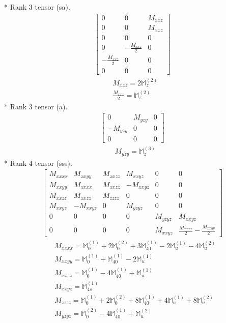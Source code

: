 \documentclass[fleqn,8pt,landscape]{jsarticle}
\begin{document}
* Rank 3 tensor (sa).
\begin{align*}
\begin{bmatrix} 0 & 0 & M_{xxz} \\ 0 & 0 & M_{xxz} \\ 0 & 0 & 0 \\ 0 & - \frac{M_{xxz}}{2} & 0 \\ - \frac{M_{xxz}}{2} & 0 & 0 \\ 0 & 0 & 0 \end{bmatrix}
\end{align*}
\begin{align*}
& M_{xxz} = 2 \mathbb{M}_{z}^{(2)} \\
& \frac{M_{xxz}}{2} = \mathbb{M}_{z}^{(2)}
\end{align*}
* Rank 3 tensor (a).
\begin{align*}
\begin{bmatrix} 0 & M_{yzy} & 0 \\ - M_{yzy} & 0 & 0 \\ 0 & 0 & 0 \end{bmatrix}
\end{align*}
\begin{align*}
& M_{yzy} = \mathbb{M}_{z}^{(3)}
\end{align*}
* Rank 4 tensor (sss).
\begin{align*}
\begin{bmatrix} M_{xxxx} & M_{xxyy} & M_{xxzz} & M_{xxyz} & 0 & 0 \\ M_{xxyy} & M_{xxxx} & M_{xxzz} & - M_{xxyz} & 0 & 0 \\ M_{xxzz} & M_{xxzz} & M_{zzzz} & 0 & 0 & 0 \\ M_{xxyz} & - M_{xxyz} & 0 & M_{yzyz} & 0 & 0 \\ 0 & 0 & 0 & 0 & M_{yzyz} & M_{xxyz} \\ 0 & 0 & 0 & 0 & M_{xxyz} & \frac{M_{xxxx}}{2} - \frac{M_{xxyy}}{2} \end{bmatrix}
\end{align*}
\begin{align*}
& M_{xxxx} = \mathbb{M}_{0}^{(1)} + 2 \mathbb{M}_{0}^{(2)} + 3 \mathbb{M}_{40}^{(1)} - 2 \mathbb{M}_{u}^{(1)} - 4 \mathbb{M}_{u}^{(2)} \\
& M_{xxyy} = \mathbb{M}_{0}^{(1)} + \mathbb{M}_{40}^{(1)} - 2 \mathbb{M}_{u}^{(1)} \\
& M_{xxzz} = \mathbb{M}_{0}^{(1)} - 4 \mathbb{M}_{40}^{(1)} + \mathbb{M}_{u}^{(1)} \\
& M_{xxyz} = \mathbb{M}_{4s}^{(1)} \\
& M_{zzzz} = \mathbb{M}_{0}^{(1)} + 2 \mathbb{M}_{0}^{(2)} + 8 \mathbb{M}_{40}^{(1)} + 4 \mathbb{M}_{u}^{(1)} + 8 \mathbb{M}_{u}^{(2)} \\
& M_{yzyz} = \mathbb{M}_{0}^{(2)} - 4 \mathbb{M}_{40}^{(1)} + \mathbb{M}_{u}^{(2)}
\end{align*}
\end{document}
